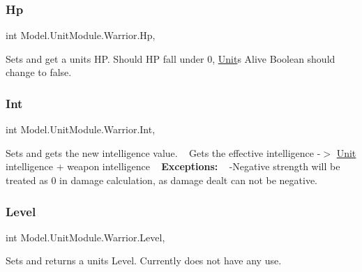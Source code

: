 \subsubsection{\texorpdfstring{Hp}{Hp}}
{\footnotesize\ttfamily int Model.\+Unit\+Module.\+Warrior.\+Hp\hspace{0.3cm}{\ttfamily [get]}, {\ttfamily [set]}}

Sets and get a unit\textquotesingle{}s HP. Should HP fall under 0, \hyperlink{interface_model_1_1_unit_module_1_1_unit}{Unit}\textquotesingle{}s Alive Boolean should change to false. \hypertarget{class_model_1_1_unit_module_1_1_warrior_ae739f9a2f57a2c8788337c55677b778c}{}\label{class_model_1_1_unit_module_1_1_warrior_ae739f9a2f57a2c8788337c55677b778c} 
\subsubsection{\texorpdfstring{Int}{Int}}
{\footnotesize\ttfamily int Model.\+Unit\+Module.\+Warrior.\+Int\hspace{0.3cm}{\ttfamily [get]}, {\ttfamily [set]}}

Sets and gets the new intelligence value. ~\newline
 Gets the effective intelligence -\/$>$ \hyperlink{interface_model_1_1_unit_module_1_1_unit}{Unit} intelligence + weapon intelligence ~\newline
 {\bfseries Exceptions\+:} ~\newline
 -\/\+Negative strength will be treated as 0 in damage calculation, as damage dealt can not be negative. \hypertarget{class_model_1_1_unit_module_1_1_warrior_a178c1a9edf70bbea02f655ef5bae6c2a}{}\label{class_model_1_1_unit_module_1_1_warrior_a178c1a9edf70bbea02f655ef5bae6c2a} 
\subsubsection{\texorpdfstring{Level}{Level}}
{\footnotesize\ttfamily int Model.\+Unit\+Module.\+Warrior.\+Level\hspace{0.3cm}{\ttfamily [get]}, {\ttfamily [set]}}

Sets and returns a unit\textquotesingle{}s Level. Currently does not have any use. \hypertarget{class_model_1_1_unit_module_1_1_warrior_a98c38047e2e0c9cca83d36d06d61da83}{}\label{class_model_1_1_unit_module_1_1_warrior_a98c38047e2e0c9cca83d36d06d61da83} 

